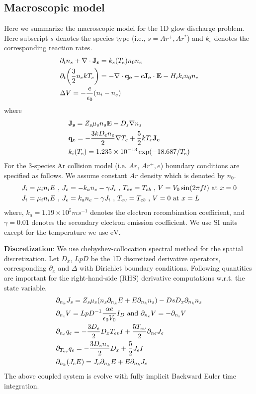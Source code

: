 \documentclass{article}[draft]
\begin{document}
\subsection{Macroscopic model}
Here we summarize the macroscopic model for the 1D glow discharge problem. Here subscript $s$ denotes the species type (i.e., $s=Ar^{+}, Ar^{*}$) and $k_s$ denotes the corresponding reaction rates. 
\begin{align}
	&\partial_t{n_{s}} + \nabla \cdot \vect{J_{s}} = k_s \of{T_e} n_0 n_e \\
	&\partial_t \of{\frac{3}{2} n_e k T_e} = -\nabla \cdot \vect{q_e} - e \vect{J_e} \cdot \vect{E} - H_ik_i n_0 n_e\\
	& \Delta V = -\frac{e}{\epsilon_0} (n_i-n_e)
\end{align} where 
\begin{align}
	&\vect{J_{s}} = Z_{s} \mu_{s} n_{s} \vect{E} -D_{s} \nabla n_{s} \\
	&\vect{q_e} 	= -\frac{3 k D_e n_e}{2} \nabla T_e + \frac{5}{2} k T_e \vect{J_e} \\
	&k_i\of{T_e}     	    = 1.235 \times 10^{-13} \exp (-18.687 / T_{e})  
\end{align} 
For the 3-species Ar collision model (i.e. $Ar$, $Ar^{+}, e$) boundary conditions are specified as follows. We assume constant $Ar$ density which is denoted by $n_0$.
\begin{align}
	&J_i = \mu_i n_i E \text{ , } J_e = -k_a n_e - \gamma J_i \text{ , } T_{ev} = T_{eb} \text{ , } V = V_0 \sin\of{2\pi f t} \text{ at } x=0\\
	&J_i  = \mu_i n_i E \text{ , } J_e = k_a n_e - \gamma J_i \text{ , } T_{ev} = T_{eb} \text{ , } V = 0 \text{ at } x=L
\end{align} where, $k_a = 1.19 \times 10^{5} ms^{-1}$ denotes the electron recombination coefficient, and $\gamma=0.01$ denotes the secondary electron emission coefficient. We use SI units except for the temperature we use $\text{eV}$.

\textbf{Discretization}: We use chebyshev-collocation spectral method for the spatial discretization. Let $D_x $, $LpD$ be the 1D discretized derivative operators, corresponding $\partial_x$ and $\Delta$ with Dirichlet boundary conditions. Following quantities are important for the right-hand-side (RHS) derivative computations w.r.t. the state variable.  
\begin{align*}
	&\partial_{n_k} J_s = Z_s \mu_s \of{n_s \partial_{n_k}E + E \partial_{n_k}n_s} -Ds D_x  \partial_{n_k}n_s \\
	&\partial_{n_i} V   = LpD^{-1} \frac{\alpha e}{\epsilon_0 V_0} I_{D} \text{ and } \partial_{n_e} V   = -\partial_{n_i} V\\
	&\partial_{n_e} q_e = -\frac{3D_e}{2} D_x T_{ev} I + \frac{5 T_{ev}}{2} \partial_{ne} J_e \\
	&\partial_{T_{ev}} q_e = -\frac{3D_e n_e}{2} D_x + \frac{5}{2} J_e I  \\
	&\partial_{n_k} \of{J_e E} = J_e \partial_{n_k} E + E \partial_{n_k} J_e \\
\end{align*} The above coupled system is evolve with fully implicit Backward Euler time integration. 
\end{document}
